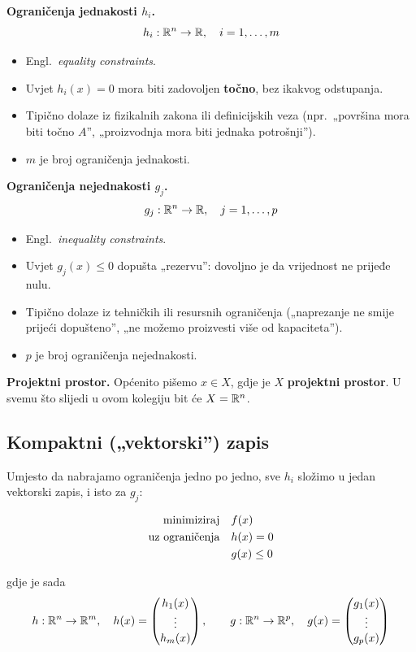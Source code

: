 \textbf{Ograničenja jednakosti $h_i$.}
\[
h_i : \R^n \to \R, \quad i = 1,\dots,m
\]

\begin{itemize}
  \item Engl.\ \emph{equality constraints}.
  \item Uvjet $h_i(x) = 0$ mora biti zadovoljen \textbf{točno}, bez ikakvog
        odstupanja.
  \item Tipično dolaze iz fizikalnih zakona ili definicijskih veza (npr.\
        „površina mora biti točno $A$”, „proizvodnja mora biti jednaka
        potrošnji”).
  \item $m$ je broj ograničenja jednakosti.
\end{itemize}

\textbf{Ograničenja nejednakosti $g_j$.}
\[
g_j : \R^n \to \R, \quad j = 1,\dots,p
\]

\begin{itemize}
  \item Engl.\ \emph{inequality constraints}.
  \item Uvjet $g_j(x) \le 0$ dopušta „rezervu”: dovoljno je da vrijednost ne
        prijeđe nulu.
  \item Tipično dolaze iz tehničkih ili resursnih ograničenja („naprezanje ne
        smije prijeći dopušteno”, „ne možemo proizvesti više od kapaciteta”).
  \item $p$ je broj ograničenja nejednakosti.
\end{itemize}

\textbf{Projektni prostor.} Općenito pišemo $x \in X$, gdje je $X$
\textbf{projektni prostor}. U svemu što slijedi u ovom kolegiju bit će
$X = \R^n$.

\subsection{Kompaktni („vektorski”) zapis}

Umjesto da nabrajamo ograničenja jedno po jedno, sve $h_i$ složimo u jedan
vektorski zapis, i isto za $g_j$:

\begin{equation}
\begin{aligned}
\minim & f(x) \\
\uzogr & h(x) = 0 \\
       & g(x) \le 0
\end{aligned}
\end{equation}

gdje je sada
\[
h : \R^n \to \R^m, \quad
h(x) = \begin{pmatrix} h_1(x) \\ \vdots \\ h_m(x) \end{pmatrix}, \qquad
g : \R^n \to \R^p, \quad
g(x) = \begin{pmatrix} g_1(x) \\ \vdots \\ g_p(x) \end{pmatrix}
\]

